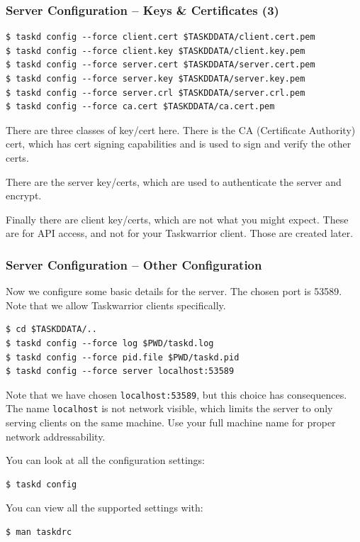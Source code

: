 \documentclass[t,handout]{beamer}
\begin{document}
\begin{frame}[fragile]\frametitle{Server Configuration -- Keys \& Certificates (3)}

    \begin{lstlisting}
$ taskd config --force client.cert $TASKDDATA/client.cert.pem
$ taskd config --force client.key $TASKDDATA/client.key.pem
$ taskd config --force server.cert $TASKDDATA/server.cert.pem
$ taskd config --force server.key $TASKDDATA/server.key.pem
$ taskd config --force server.crl $TASKDDATA/server.crl.pem
$ taskd config --force ca.cert $TASKDDATA/ca.cert.pem\end{lstlisting}

    There are three classes of key/cert here. There is the CA (Certificate Authority) cert, which has cert signing capabilities and is used to sign and verify the other certs.

    There are the server key/certs, which are used to authenticate the server and encrypt.

    Finally there are client key/certs, which are not what you might  expect. These are for API access, and not for your Taskwarrior client. Those are created later.
\end{frame}

\begin{frame}[fragile]\frametitle{Server Configuration -- Other Configuration}
    Now we configure some basic details for the server.  The chosen port is 53589. Note that we allow Taskwarrior clients specifically.

    \begin{lstlisting}
$ cd $TASKDDATA/..
$ taskd config --force log $PWD/taskd.log
$ taskd config --force pid.file $PWD/taskd.pid
$ taskd config --force server localhost:53589\end{lstlisting}

    Note that we have chosen \verb+localhost:53589+, but this choice has consequences. The name \verb+localhost+ is not network visible, which limits the server to only serving clients on the same machine. Use your full machine name for proper network addressability.

    You can look at all the configuration settings:

    \begin{lstlisting}
$ taskd config\end{lstlisting}

    You can view all the supported settings with:

    \begin{lstlisting}
$ man taskdrc\end{lstlisting}
\end{frame}
\end{document}
